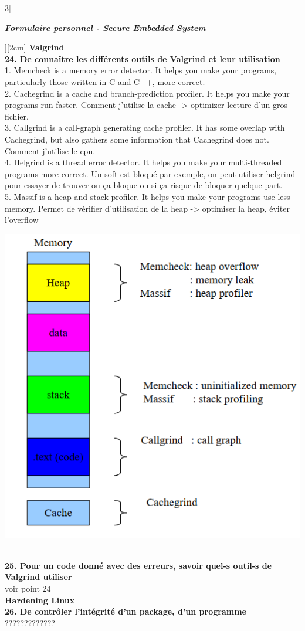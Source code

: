 \begin{multicols}{3}[\centerline{ \large\em \textbf{Formulaire personnel - Secure Embedded System}}][2cm]
{\Large \textbf{Valgrind}}
\\ \textbf{24. De connaître les différents outils de Valgrind et leur utilisation\\}
1. Memcheck is a memory error detector. It helps you make your programs, particularly those written in C and C++, more correct.\\
2. Cachegrind is a cache and branch-prediction profiler. It helps you make your programs run faster. Comment j'utilise la cache -> optimizer lecture d'un gros fichier.\\
3. Callgrind is a call-graph generating cache profiler. It has some overlap with Cachegrind, but also gathers some information that Cachegrind does not. Comment j'utilise le cpu.\\
4. Helgrind is a thread error detector. It helps you make your multi-threaded programs more correct. Un soft est bloqué par exemple, on peut utiliser helgrind pour essayer de trouver ou ça bloque ou si ça risque de bloquer quelque part.\\
5. Massif is a heap and stack profiler. It helps you make your programs use less memory. Permet de vérifier d'utilisation de la heap -> optimiser la heap, éviter l'overflow\\
\begin{minipage}{\linewidth}
	\centering
    \includegraphics[width =0.4\columnwidth]{images/10.png}
\end{minipage}
\\ \textbf{25. Pour un code donné avec des erreurs, savoir quel-s outil-s de Valgrind utiliser\\}
voir point 24\\
{\Large \textbf{Hardening Linux}}
\\ \textbf{26. De contrôler l’intégrité d’un package, d’un programme\\}
?????????????

\end{multicols}
